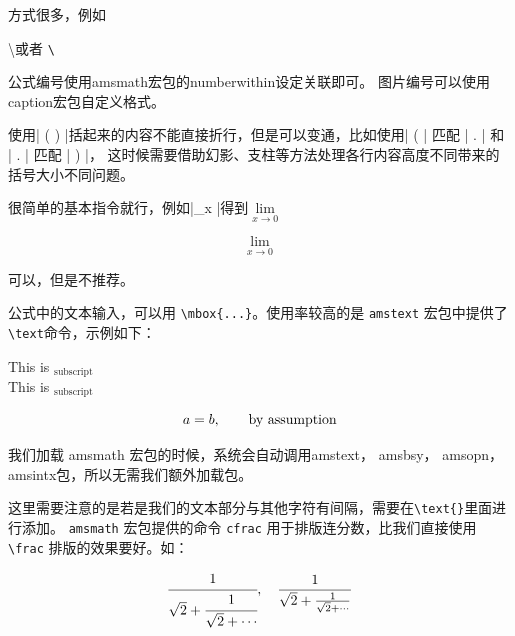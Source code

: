 方式很多，例如
\begin{example}
  \textbackslash \quad 或者 \quad \verb|\|
\end{example}
%



公式编号使用amsmath宏包的numberwithin设定关联即可。
图片编号可以使用caption宏包自定义格式。

使用| \left( \right) |括起来的内容不能直接折行，但是可以变通，比如使用| \left( | 匹配 | \right. | 和 | \left. | 匹配 | \right) |，
这时候需要借助幻影、支柱等方法处理各行内容高度不同带来的括号大小不同问题。

很简单的基本指令就行，例如|\lim\limits_{x }|得到$\lim\limits_{x \to 0}$
\begin{example}
\[
  \lim\limits_{x \to 0}
\]
\end{example}

可以，但是不推荐。

公式中的文本输入，可以用 \verb|\mbox{...}|。使用率较高的是 \texttt{amstext} 宏包中提供了\verb|\text|命令，示例如下：
\begin{example}
\begin{center}
  This is $_{\text{subscript}}$\\
  This is $_{\mbox{subscript}}$
\end{center}
\[a = b, \text{\qquad by assumption}\]
\end{example}

	我们加载 amsmath 宏包的时候，系统会自动调用amstext， amsbsy， amsopn，
	amsintx包，所以无需我们额外加载包。

 这里需要注意的是若是我们的文本部分与其他字符有间隔，需要在\verb|\text{}|里面进行添加。
{}
\verb|amsmath| 宏包提供的命令 \verb|cfrac| 用于排版连分数，比我们直接使用 \verb|\frac| 排版的效果要好。如：
\begin{example}
\[
  \cfrac{1}{\sqrt 2 + \cfrac{1}{\sqrt 2 +\dotsb}},\quad
  \frac{1}{\sqrt 2 + \frac{1}{\sqrt 2 +\dotsb}}
\]
\end{example}


